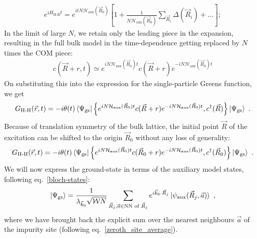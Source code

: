 \documentclass{report}
\numberwithin{equation}{section}
\begin{document}
\begin{equation}\begin{aligned}
	e^{i H_\text{H-H} t} = e^{i t N \mathcal{H}_\text{aux}(\vec R_0)}\left[1 + \frac{1}{N \mathcal{H}_\text{aux}(\vec R_0)}\sum_{\vec R_i} \Delta(\vec R_i) + \ldots\right];
\end{aligned}\end{equation}
In the limit of large \(N\), we retain only the leading piece in the expansion, resulting in the full bulk model in the time-dependence getting replaced by \(N\) times the COM piece:
\begin{equation}\begin{aligned}
	c(\vec R + r,t) \simeq e^{i N \mathcal{H}_\text{aux}(\vec R_0) t}c(\vec R + r)e^{-i N \mathcal{H}_\text{aux}(\vec R_0) t}
\end{aligned}\end{equation}
On substituting this into the expression for the single-particle Greens function, we get
\begin{equation}\begin{aligned}
	G_\text{H-H}(\vec r, t) = -i\theta(t) \braket{\Psi_\text{gs} | \left\{ e^{i N \mathcal{H}_\text{aux}(\vec R_0) t}c(\vec R + r)e^{-i N \mathcal{H}_\text{aux}(\vec R_0) t}, c^\dagger(\vec R) \right\} | \Psi_\text{gs}}~.
\end{aligned}\end{equation}
Because of translation symmetry of the bulk lattice, the initial point \(\vec R\) of the excitation can be shifted to the origin \(\vec R_0\) without any loss of generality:
\begin{equation}\begin{aligned}
	G_\text{H-H}(\vec r, t) = -i\theta(t) \braket{\Psi_\text{gs} | \left\{ e^{i N \mathcal{H}_\text{aux}(\vec R_0) t}c(\vec R_0 + r)e^{-i N \mathcal{H}_\text{aux}(\vec R_0) t}, c^\dagger(\vec R_0) \right\} | \Psi_\text{gs}}~.
\end{aligned}\end{equation}
We will now express the ground-state in terms of the auxiliary model states, following eq.~\ref{bloch-states}:
\begin{equation}\begin{aligned}
	\ket{\Psi_\text{gs}} = \frac{1}{\lambda_{\vec k_0} \sqrt{\mathcal{W} N}}\sum_{\vec R_j, \vec a \in \text{NN of }\vec R_j} e^{i \vec{k}_0\cdot\vec{R}_j} \ket{\psi_\text{aux}(\vec R_j, \vec a)}~,
\end{aligned}\end{equation}
where we have brought back the explicit sum over the nearest neighbours \(\vec a\) of the impurity site (following eq.~\ref{zeroth_site_average}).
\end{document}
